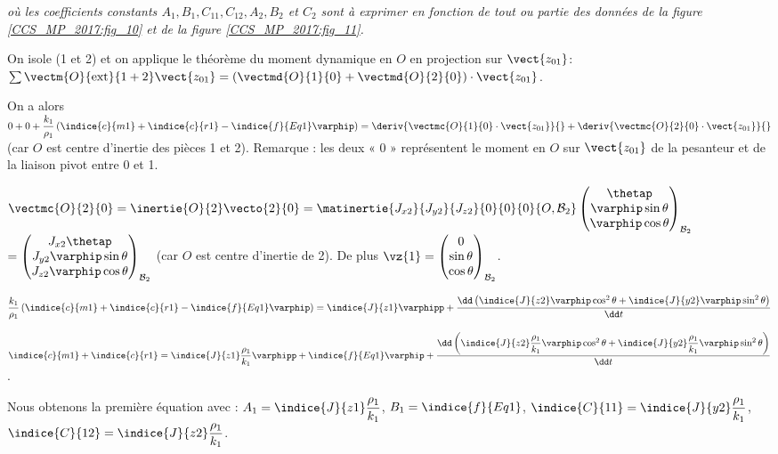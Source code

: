 \textit{où les coefficients constants $A_{1}, B_{1}, C_{11}, C_{12}, A_{2}, B_{2}$ et $C_{2}$ sont à exprimer en fonction de tout ou partie des données de la figure \ref{CCS_MP_2017:fig_10} et de la figure \ref{CCS_MP_2017:fig_11}.}

\ifprof
\begin{corrige}
On isole (1 et 2) et on applique le théorème du moment dynamique en $O$ en projection sur $\vect{z_{01}}$:
$\sum \vectm{O}{\text{ext}}{1+2} \vect{z_{01}}  = \left(\vectmd{O}{1}{0} + \vectmd{O}{2}{0}\right)\cdot \vect{z_{01}}$.

On a alors  
$0+0+\dfrac{k_1}{\rho_1} \left(\indice{c}{m1}+\indice{c}{r1}-\indice{f}{Eq1} \varphip \right)=
\deriv{\vectmc{O}{1}{0}\cdot \vect{z_{01}}}{} + \deriv{\vectmc{O}{2}{0}\cdot \vect{z_{01}}}{}$
(car $O$ est centre d’inertie des pièces 1 et 2). Remarque : les deux « 0 » représentent le moment en $O$ sur $\vect{z_{01}}$ de la pesanteur et de la liaison pivot entre 0 et 1.

$\vectmc{O}{2}{0} = \inertie{O}{2} \vecto{2}{0} 
= \matinertie{J_{x2}}{J_{y2}}{J_{z2}}{0}{0}{0}{O,\mathcal{B}_2} \begin{pmatrix} \thetap \\ \varphip\sin\theta \\ \varphip \cos \theta \end{pmatrix}_{\mathcal{B}_2}$
$=\begin{pmatrix} J_{x2} \thetap \\ J_{y2}\varphip\sin\theta \\ J_{z2}\varphip \cos \theta \end{pmatrix}_{\mathcal{B}_2}$  (car $O$ est centre d’inertie de 2). De plus $\vz{1}=\begin{pmatrix} 0 \\ \sin\theta \\ \cos \theta \end{pmatrix}_{\mathcal{B}_2}$.

$\dfrac{k_1}{\rho_1} \left(\indice{c}{m1}  +\indice{c}{r1}  -\indice{f}{Eq1} \varphip \right)=\indice{J}{z1} \varphipp+\dfrac{\dd \left(\indice{J}{z2} \varphip  \cos^2 \theta+\indice{J}{y2} \varphip \sin^2 \theta\right)}{\dd t}$
  
$\indice{c}{m1}  +\indice{c}{r1}  =\indice{J}{z1}\dfrac{\rho_1}{k_1}\varphipp+\indice{f}{Eq1} \varphip+\dfrac{\dd \left(
\indice{J}{z2}\dfrac{\rho_1}{k_1}\varphip \cos^2 \theta+\indice{J}{y2}\dfrac{\rho_1}{k_1}\varphip \sin^2 \theta \right)}{\dd t}$.

Nous obtenons la première équation avec : $A_1=\indice{J}{z1}\dfrac{\rho_1}{k_1}$, $B_1=\indice{f}{Eq1}$, $\indice{C}{11}=\indice{J}{y2}\dfrac{\rho_1}{k_1}$, $\indice{C}{12}=\indice{J}{z2}\dfrac{\rho_1}{k_1}$.  


\end{corrige}
